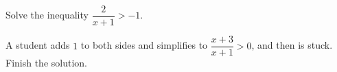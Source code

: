 Solve the inequality $\dfrac{2}{x+1}>-1$.

A student adds $1$ to both sides and simplifies to $\dfrac{x+3}{x+1}>0$, and then is stuck. Finish the solution.
